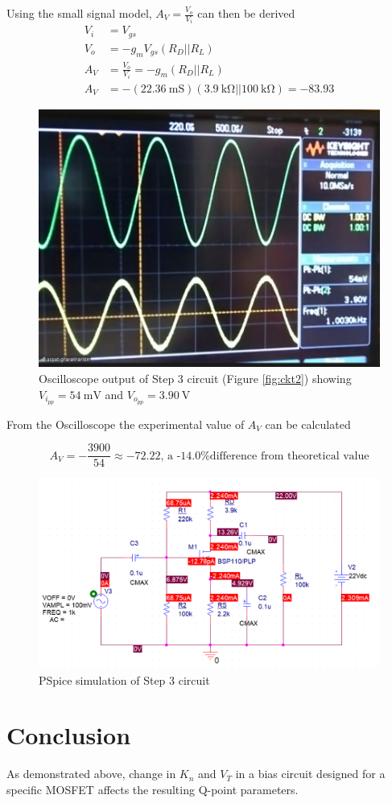 \documentclass{article}
\begin{document}
Using the small signal model, $A_V = \frac{V_o}{V_i}$ can then be derived
\begin{align*}
  V_i &= V_{gs}\\
  V_o &= -g_mV_{gs}\left(R_D||R_L \right)\\
  A_V &= \frac{V_o}{V_i} = -g_m\left(R_D||R_L \right)\\
  A_V &= -(\SI{22.36}{\milli\siemens})(\SI{3.9}{\kilo\ohm}||\SI{100}{\kilo\ohm})=-83.93
\end{align*}

\begin{figure}[H]
  \centering
  \includegraphics[width=\textwidth]{ECE2200L_Lab8_scope.png}
  \caption{Oscilloscope output of Step 3 circuit (Figure \ref{fig:ckt2}) showing $V_{i_{pp}} = \SI{54}{\milli\volt}$ and $V_{o_{pp}} = \SI{3.90}{\volt}$}
  \label{fig:IV2}
\end{figure}

From the Oscilloscope the experimental value of $A_V$ can be calculated

$$A_V = -\frac{3900}{54}\approx-72.22\text{, a -14.0\% difference from theoretical value}$$

\newpage

\begin{figure}[H]
  \centering
  \includegraphics[width=\textwidth]{ECE2200L_Lab8_PSpice.png}
  \caption{PSpice simulation of Step 3 circuit}
  \label{fig:IV2}
\end{figure}

\section*{Conclusion}
As demonstrated above, change in $K_n$ and $V_T$ in a bias circuit designed for a specific MOSFET affects the resulting Q-point parameters.
\end{document}
